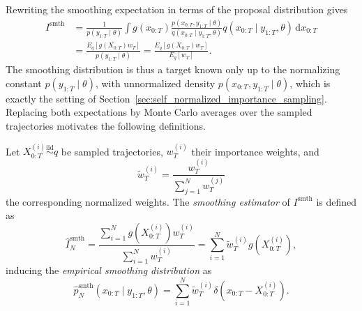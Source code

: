 Rewriting the smoothing expectation in terms of the proposal distribution gives
\begin{align}
    I^{\mathrm{smth}} &= \frac{1}{p(y_{1:T}\mid\theta)} \int g(x_{0:T}) \frac{p(x_{0:T},y_{1:T}\mid\theta)}{q(x_{0:T}\mid y_{1:T},\theta)} q(x_{0:T}\mid y_{1:T},\theta)\,\mathrm{d}x_{0:T} \\
    &= \frac{E_q\left[g(X_{0:T})w_T\right]}{p(y_{1:T}\mid\theta)}
    = \frac{E_q\left[g(X_{0:T})w_T\right]}{E_q\left[w_T\right]}.
\end{align}
The smoothing distribution is thus a target known only up to the normalizing constant $p(y_{1:T}\mid\theta)$, with unnormalized density $p(x_{0:T},y_{1:T}\mid\theta)$, which is exactly the setting of Section~\ref{sec:self_normalized_importance_sampling}. Replacing both expectations by Monte Carlo averages over the sampled trajectories motivates the following definitions.

\begin{definition}
    \label{def:smoothing_estimator}
    Let $X_{0:T}^{(i)} \overset{\mathrm{iid}}{\sim} q$ be sampled trajectories, $w_T^{(i)}$ their importance weights, and
    \begin{equation}
        \tilde{w}_T^{(i)} = \frac{w_T^{(i)}}{\sum_{j=1}^{N} w_T^{(j)}}
    \end{equation}
    the corresponding normalized weights. The \emph{smoothing estimator} of $I^{\mathrm{smth}}$ is defined as
    \begin{equation}
        \hat{I}_N^{\mathrm{smth}} = \frac{\sum_{i=1}^{N} g(X_{0:T}^{(i)}) w_T^{(i)}}{\sum_{i=1}^{N} w_T^{(i)}} = \sum_{i=1}^{N} \tilde{w}_T^{(i)} g(X_{0:T}^{(i)}),
        \label{eq:smoothing_estimator}
    \end{equation}
    inducing the \emph{empirical smoothing distribution} as
    \begin{equation}
        \hat{p}_N^{\mathrm{smth}}(x_{0:T}\mid y_{1:T},\theta) = \sum_{i=1}^{N} \tilde{w}_T^{(i)} \delta(x_{0:T}-X_{0:T}^{(i)}).
        \label{eq:empirical_smoothing_distribution}
    \end{equation}
\end{definition}

